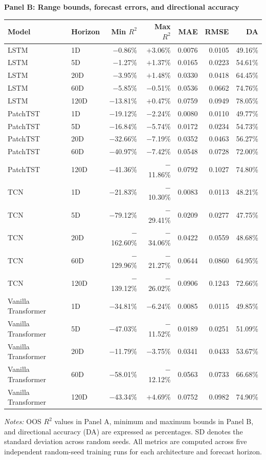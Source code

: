 \documentclass[runningheads,orivec]{llncs}
\begin{document}
\begin{table}[htbp]
\vspace{8pt}
\setlength{\tabcolsep}{3.2pt}
\textbf{Panel B: Range bounds, forecast errors, and directional accuracy}\\[3pt]
\begin{tabular}{llrrrrr}
\hline
Model & Horizon & Min $R^2$ & Max $R^2$ & MAE & RMSE & DA \\
\hline
LSTM & 1D   & $-$0.86\% & $+$3.06\% & 0.0076 & 0.0105 & 49.16\% \\
LSTM & 5D   & $-$1.27\% & $+$1.37\% & 0.0165 & 0.0223 & 54.61\% \\
LSTM & 20D  & $-$3.95\% & $+$1.48\% & 0.0330 & 0.0418 & 64.45\% \\
LSTM & 60D  & $-$5.85\% & $-$0.51\% & 0.0536 & 0.0662 & 74.76\% \\
LSTM & 120D & $-$13.81\% & $+$0.47\% & 0.0759 & 0.0949 & 78.05\% \\
\hline
PatchTST & 1D   & $-$19.12\% & $-$2.24\% & 0.0080 & 0.0110 & 49.77\% \\
PatchTST & 5D   & $-$16.84\% & $-$5.74\% & 0.0172 & 0.0234 & 54.73\% \\
PatchTST & 20D  & $-$32.66\% & $-$7.19\% & 0.0352 & 0.0463 & 56.27\% \\
PatchTST & 60D  & $-$40.97\% & $-$7.42\% & 0.0548 & 0.0728 & 72.00\% \\
PatchTST & 120D & $-$41.36\% & $-$11.86\% & 0.0792 & 0.1027 & 74.80\% \\
\hline
TCN & 1D   & $-$21.83\% & $-$10.30\% & 0.0083 & 0.0113 & 48.21\% \\
TCN & 5D   & $-$79.12\% & $-$29.41\% & 0.0209 & 0.0277 & 47.75\% \\
TCN & 20D  & $-$162.60\% & $-$34.06\% & 0.0422 & 0.0559 & 48.68\% \\
TCN & 60D  & $-$129.96\% & $-$21.27\% & 0.0644 & 0.0860 & 64.95\% \\
TCN & 120D & $-$139.12\% & $-$26.02\% & 0.0906 & 0.1243 & 72.66\% \\
\hline
Vanilla Transformer & 1D   & $-$34.81\% & $-$6.24\% & 0.0085 & 0.0115 & 49.85\% \\
Vanilla Transformer & 5D   & $-$47.03\% & $-$11.52\% & 0.0189 & 0.0251 & 51.09\% \\
Vanilla Transformer & 20D  & $-$11.79\% & $-$3.75\% & 0.0341 & 0.0433 & 53.67\% \\
Vanilla Transformer & 60D  & $-$58.01\% & $-$12.12\% & 0.0563 & 0.0733 & 66.68\% \\
Vanilla Transformer & 120D & $-$43.34\% & $+$4.69\% & 0.0752 & 0.0982 & 74.90\% \\
\hline
\end{tabular}
\par\vspace{4pt}\parbox{\linewidth}{\scriptsize\textit{Notes:} OOS $R^2$ values in Panel A, minimum and maximum bounds in Panel B, and directional accuracy (DA) are expressed as percentages. SD denotes the standard deviation across random seeds. All metrics are computed across five independent random-seed training runs for each architecture and forecast horizon.}
\end{table}
\end{document}
